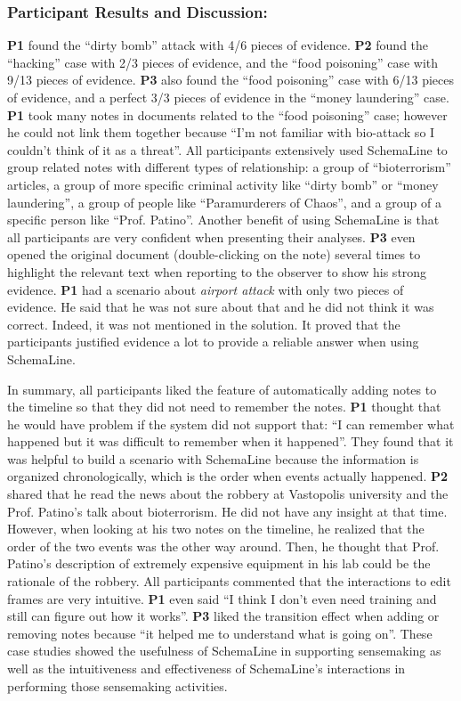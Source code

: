 \subsubsection{Participant Results and Discussion:}
\textbf{P1} found the ``dirty bomb'' attack with 4/6 pieces of evidence. \textbf{P2} found the ``hacking'' case with 2/3 pieces of evidence, and the ``food poisoning'' case with 9/13 pieces of evidence. \textbf{P3} also found the ``food poisoning'' case with 6/13 pieces of evidence, and a perfect 3/3 pieces of evidence in the ``money laundering'' case. \textbf{P1} took many notes in documents related to the ``food poisoning'' case; however he could not link them together because ``I'm not familiar with bio-attack so I couldn't think of it as a threat''. All participants extensively used SchemaLine to group related notes with different types of relationship: a group of ``bioterrorism'' articles, a group of more specific criminal activity like ``dirty bomb'' or ``money laundering'', a group of people like ``Paramurderers of Chaos'', and a group of a specific person like ``Prof. Patino''. Another benefit of using SchemaLine is that all participants are very confident when presenting their analyses. \textbf{P3} even opened the original document (double-clicking on the note) several times to highlight the relevant text when reporting to the observer to show his strong evidence. \textbf{P1} had a scenario about \textit{airport attack} with only two pieces of evidence. He said that he was not sure about that and he did not think it was correct. Indeed, it was not mentioned in the solution. It proved that the participants justified evidence a lot to provide a reliable answer when using SchemaLine.

In summary, all participants liked the feature of automatically adding notes to the timeline so that they did not need to remember the notes. \textbf{P1} thought that he would have problem if the system did not support that: ``I can remember what happened but it was difficult to remember when it happened''. They found that it was helpful to build a scenario with SchemaLine because the information is organized chronologically, which is the order when events actually happened. \textbf{P2} shared that he read the news about the robbery at Vastopolis university and the Prof. Patino's talk about bioterrorism. He did not have any insight at that time. However, when looking at his two notes on the timeline, he realized that the order of the two events was the other way around. Then, he thought that Prof. Patino's description of extremely expensive equipment in his lab could be the rationale of the robbery. All participants commented that the interactions to edit frames are very intuitive. \textbf{P1} even said ``I think I don't even need training and still can figure out how it works''. \textbf{P3} liked the transition effect when adding or removing notes because ``it helped me to understand what is going on''. These case studies showed the usefulness of SchemaLine in supporting sensemaking as well as the intuitiveness and effectiveness of SchemaLine's interactions in performing those sensemaking activities. 


